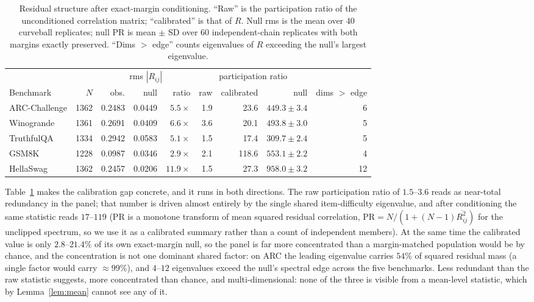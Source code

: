 \documentclass{article}
\begin{document}
\begin{table}[t]
\centering
\small
\begin{tabular}{lrrrrrrrr}
\toprule
 & & \multicolumn{3}{c}{rms $|R_{ij}|$} & \multicolumn{3}{c}{participation ratio} & \\
\cmidrule(lr){3-5}\cmidrule(lr){6-8}
Benchmark & $N$ & obs. & null & ratio & raw & calibrated & null & dims $>$ edge \\
\midrule
ARC-Challenge & 1362 & 0.2483 & 0.0449 & $5.5\times$ & 1.9 & 23.6 & $449.3\pm3.4$ & 6 \\
Winogrande    & 1361 & 0.2691 & 0.0409 & $6.6\times$ & 3.6 & 20.1 & $493.8\pm3.0$ & 5 \\
TruthfulQA    & 1334 & 0.2942 & 0.0583 & $5.1\times$ & 1.5 & 17.4 & $309.7\pm2.4$ & 5 \\
GSM8K         & 1228 & 0.0987 & 0.0346 & $2.9\times$ & 2.1 & 118.6 & $553.1\pm2.2$ & 4 \\
HellaSwag     & 1362 & 0.2457 & 0.0206 & $11.9\times$ & 1.5 & 27.3 & $958.0\pm3.2$ & 12 \\
\bottomrule
\end{tabular}
\caption{Residual structure after exact-margin conditioning. ``Raw'' is the participation ratio of
the unconditioned correlation matrix; ``calibrated'' is that of $R$. Null rms is the mean over
$40$ curveball replicates; null PR is mean $\pm$ SD over $60$ independent-chain replicates with
both margins exactly preserved. ``Dims $>$ edge'' counts eigenvalues of $R$ exceeding the null's
largest eigenvalue.}
\label{tab:neff}
\end{table}

Table~\ref{tab:neff} makes the calibration gap concrete, and it runs in both directions. The raw
participation ratio of $1.5$--$3.6$ reads as near-total redundancy in the panel; that number is
driven almost entirely by the single shared item-difficulty eigenvalue, and after conditioning
the same statistic reads $17$--$119$ (PR is a monotone transform of mean squared residual
correlation, $\mathrm{PR}=N/(1+(N-1)\overline{R_{ij}^2})$ for the unclipped spectrum, so we use it as a
calibrated summary rather than a count of independent members). At the same time the calibrated
value is only
$2.8$--$21.4\%$ of its own exact-margin null, so the panel is far more concentrated than a
margin-matched population would be by chance, and the concentration is not one dominant shared
factor: on ARC the leading eigenvalue carries $54\%$ of squared residual mass (a single factor would
carry $\approx99\%$), and $4$--$12$ eigenvalues exceed the null's spectral edge across the five
benchmarks. Less redundant than the raw statistic suggests, more concentrated than chance, and
multi-dimensional: none of the three is visible from a mean-level statistic, which by
Lemma~\ref{lem:mean} cannot see any of it.
\end{document}
